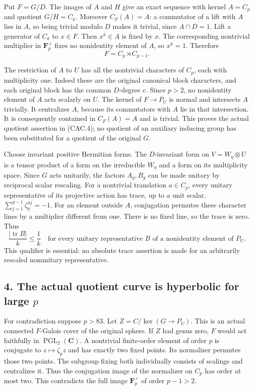 Put \(F=G/D\). The images of \(A\) and \(H\) give an exact sequence
with kernel \(A=C_p\) and quotient \(G/H=C_k\).
Moreover \(C_F(A)=A\): a commutator of a lift with \(A\)
lies in \(A\), so being trivial modulo \(D\) makes it trivial,
since \(A\cap D=1\). Lift a generator of \(C_k\) to \(x\in F\).
Then \(x^k\in A\) is fixed by \(x\). The corresponding nontrivial
multiplier in \(\mathbf F_p^\times\) fixes no nonidentity element
of \(A\), so \(x^k=1\). Therefore
\[
                 F=C_p\rtimes C_{p-1}.
 \tag{CAC.10}
\]

The restriction of \(A\) to \(U\) has all the nontrivial
characters of \(C_p\), each with multiplicity one.
Indeed these are the original canonical block characters, and
each original block has the common \(D\)-degree \(e\).
Since \(p>2\), no nonidentity element of \(A\) acts scalarly on \(U\).
The kernel of \(F\to P_U\) is normal and intersects \(A\) trivially.
It centralizes \(A\), because its commutators with \(A\) lie in
that intersection. It is consequently contained in \(C_F(A)=A\)
and is trivial. This proves the actual quotient assertion in
(CAC.4); no quotient of an auxiliary inducing group has been
substituted for a quotient of the original \(G\).

Choose invariant positive Hermitian forms. The \(D\)-invariant
form on \(V=W_\eta\otimes U\) is a tensor product of a form on
the irreducible \(W_\eta\) and a form on its multiplicity space.
Since \(G\) acts unitarily, the factors \(A_g,B_g\) can be made
unitary by reciprocal scalar rescaling. For a nontrivial
translation \(a\in C_p\), every unitary representative of its
projective action has trace, up to a unit scalar,
\(\sum_{j=1}^{p-1}\zeta_p^{aj}=-1\).
For an element outside \(A\), conjugation permutes these
character lines by a multiplier different from one. There is
no fixed line, so the trace is zero. Thus
\[
 \frac{|\operatorname{tr}B|}{k}\le\frac1k
 \quad\text{for every unitary representative \(B\) of a
 nonidentity element of \(P_U\)}.
 \tag{CAC.11}
\]
This qualifier is essential: no absolute trace assertion is
made for an arbitrarily rescaled nonunitary representative.

\subsection*{4. The actual quotient curve is hyperbolic for large \(p\)}

For contradiction suppose \(p>83\). Let
\(Z=C/\ker(G\to P_U)\). This is an actual connected
\(F\)-Galois cover of the original sphere.
If \(Z\) had genus zero, \(F\) would act faithfully in
\(\operatorname{PGL}_2(\mathbf C)\).
A nontrivial finite-order element of order \(p\) is conjugate
to \(z\mapsto\zeta_p z\) and has exactly two fixed points.
Its normalizer permutes those two points. The subgroup fixing
both individually consists of scalings and centralizes it.
Thus the conjugation image of the normalizer on \(C_p\)
has order at most two. This contradicts the full image
\(\mathbf F_p^\times\) of order \(p-1>2\).

